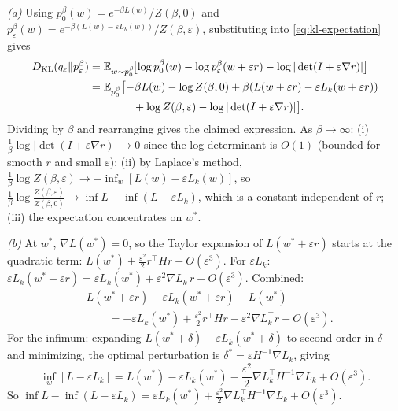 \begin{solution}[ex:bif-ot]

\textit{(a)} Using $p_0^\beta(w) = e^{-\beta L(w)}/Z(\beta,0)$ and $p_\varepsilon^\beta(w) = e^{-\beta(L(w)-\varepsilon L_k(w))}/Z(\beta,\varepsilon)$, substituting into \eqref{eq:kl-expectation} gives
\begin{align*}
  D_{\mathrm{KL}}(q_\varepsilon \| p_\varepsilon^\beta)
  &= \mathbb{E}_{w\sim p_0^\beta}\!\bigl[\log p_0^\beta(w) - \log p_\varepsilon^\beta(w+\varepsilon r) - \log|\det(I+\varepsilon\nabla r)|\bigr] \\
  &= \mathbb{E}_{p_0^\beta}\bigl[-\beta L(w) - \log Z(\beta,0) + \beta(L(w+\varepsilon r) - \varepsilon L_k(w+\varepsilon r)) \\
  &\qquad\qquad + \log Z(\beta,\varepsilon) - \log|\det(I+\varepsilon\nabla r)|\bigr].
\end{align*}
Dividing by $\beta$ and rearranging gives the claimed expression. As $\beta\to\infty$: (i) $\frac{1}{\beta}\log|\det(I+\varepsilon\nabla r)| \to 0$ since the log-determinant is $O(1)$ (bounded for smooth $r$ and small $\varepsilon$); (ii) by Laplace's method, $\frac{1}{\beta}\log Z(\beta,\varepsilon) \to -\inf_w[L(w)-\varepsilon L_k(w)]$, so $\frac{1}{\beta}\log\frac{Z(\beta,\varepsilon)}{Z(\beta,0)} \to \inf L - \inf(L-\varepsilon L_k)$, which is a constant independent of $r$; (iii) the expectation concentrates on $w^*$.

\textit{(b)} At $w^*$, $\nabla L(w^*)=0$, so the Taylor expansion of $L(w^*+\varepsilon r)$ starts at the quadratic term: $L(w^*) + \frac{\varepsilon^2}{2}r^\top Hr + O(\varepsilon^3)$. For $\varepsilon L_k$: $\varepsilon L_k(w^*+\varepsilon r) = \varepsilon L_k(w^*) + \varepsilon^2\nabla L_k^\top r + O(\varepsilon^3)$. Combined:
\begin{align*}
  &L(w^*+\varepsilon r) - \varepsilon L_k(w^*+\varepsilon r) - L(w^*) \\
  &\qquad= -\varepsilon L_k(w^*) + \frac{\varepsilon^2}{2}r^\top Hr - \varepsilon^2\nabla L_k^\top r + O(\varepsilon^3).
\end{align*}
For the infimum: expanding $L(w^*+\delta)-\varepsilon L_k(w^*+\delta)$ to second order in $\delta$ and minimizing, the optimal perturbation is $\delta^* = \varepsilon H^{-1}\nabla L_k$, giving
\[
  \inf_w[L-\varepsilon L_k] = L(w^*) - \varepsilon L_k(w^*) - \frac{\varepsilon^2}{2}\nabla L_k^\top H^{-1}\nabla L_k + O(\varepsilon^3).
\]
So $\inf L - \inf(L-\varepsilon L_k) = \varepsilon L_k(w^*) + \frac{\varepsilon^2}{2}\nabla L_k^\top H^{-1}\nabla L_k + O(\varepsilon^3)$.


\end{solution}
